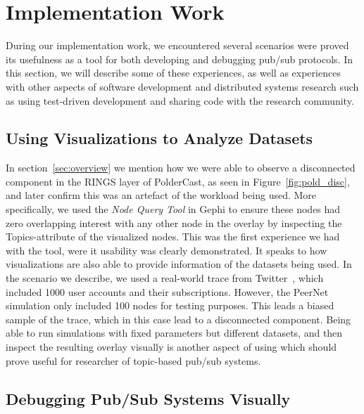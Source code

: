 \section{Implementation Work}

During our implementation work, we encountered several scenarios were
\demo proved its usefulness as a tool for both developing and debugging
pub/sub protocols. In this section, we will describe some of these
experiences, as well as experiences with other aspects of software
development and distributed systems research such as using test-driven
development and sharing code with the research community.

\subsection{Using Visualizations to Analyze Datasets}

In section~\ref{sec:overview} we mention how we were able to observe a
disconnected component in the RINGS layer of PolderCast, as seen in
Figure~\ref{fig:pold_disc}, and later confirm this was an artefact of
the workload being used. More specifically, we used the \emph{Node Query
    Tool} in Gephi to ensure these nodes had zero overlapping interest
with any other node in the overlay by inspecting the Topics-attribute of
the visualized nodes. This was the first experience we had with the tool, were it
usability was clearly demonstrated. It speaks to how visualizations are
also able to provide information of the datasets being used. In the
scenario we describe, we used a real-world trace from Twitter~\cite{Kwak10www},
which included 1000 user accounts and their subscriptions. However, the
PeerNet simulation only included 100 nodes for testing purposes. This
leads a biased sample of the trace, which in this case lead to a
disconnected component. Being able to run simulations with fixed
parameters but different datasets, and then inspect the resulting
overlay visually is another aspect of using \demo which should prove
useful for researcher of topic-based pub/sub systems.

\subsection{Debugging Pub/Sub Systems Visually}

